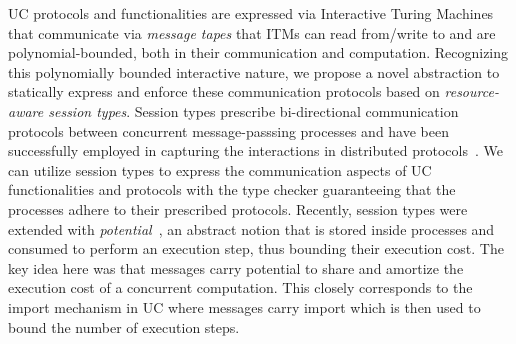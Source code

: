 UC protocols and functionalities are expressed via Interactive Turing Machines that communicate via \emph{message tapes} that ITMs can read from/write to
and are polynomial-bounded, both in their communication and computation.
Recognizing this polynomially bounded interactive nature, we propose a novel abstraction to statically express and enforce these
communication protocols based on \emph{resource-aware session types}.
Session types prescribe bi-directional communication protocols between concurrent message-passsing processes and have been successfully employed
in capturing the interactions in distributed protocols~\cite{dasnomos,Das20FSCD,Das22LMCS,Das20arxiv}.
We can utilize session types to express the communication aspects of UC functionalities and protocols with the type checker
guaranteeing that the processes adhere to their prescribed protocols.
Recently, session types were extended with \emph{potential}~\cite{das2018work}, an abstract notion that is stored inside processes and
consumed to perform an execution step, thus bounding their execution cost.
The key idea here was that messages carry potential to share and amortize the execution cost of a concurrent computation.
This closely corresponds to the import mechanism in UC where messages carry import which is then used to bound the number of execution steps.



